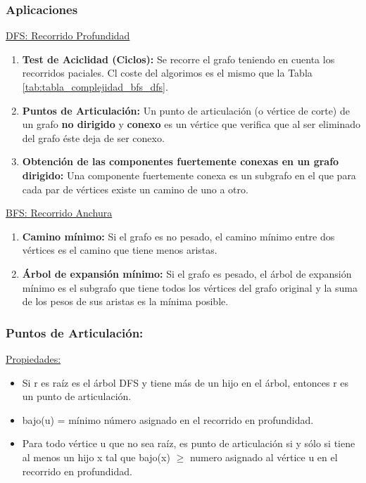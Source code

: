 \documentclass[../main.tex]{subfiles}
\begin{document}
        \subsubsection{Aplicaciones}
            \underline{DFS: Recorrido Profundidad}
            \begin{enumerate}
                \item \textbf{Test de Aciclidad (Ciclos):} Se recorre el grafo teniendo en cuenta los recorridos paciales. Cl coste del algorimos es el mismo que la Tabla \ref{tab:tabla_complejidad_bfs_dfs}.
                \item  \textbf{Puntos de Articulación:} Un punto de articulación (o vértice de corte) de un grafo \textbf{no dirigido} y \textbf{conexo} es un vértice que verifica que al ser eliminado del grafo éste deja de ser conexo.
                \item \textbf{Obtención de las componentes fuertemente conexas en un grafo dirigido:} Una componente fuertemente conexa es un subgrafo en el que para cada par de vértices existe un camino de uno a otro.
            \end{enumerate}

            \underline{BFS: Recorrido Anchura}
            \begin{enumerate}
                \item \textbf{Camino mínimo:} Si el grafo es no pesado, el camino mínimo entre dos vértices es el camino que tiene menos aristas.
                \item \textbf{Árbol de expansión mínimo:} Si el grafo es pesado, el árbol de expansión mínimo es el subgrafo que tiene todos los vértices del grafo original y la suma de los pesos de sus aristas es la mínima posible.
            \end{enumerate}

        \subsubsection{Puntos de Articulación:}
            \underline{Propiedades:}
            \begin{itemize}
                \item Si r es raíz es el árbol DFS y tiene más de un hijo en el árbol, entonces r es un punto de articulación.
                \item bajo(u) = mínimo número asignado en el recorrido en profundidad.
                \item Para todo vértice u que no sea raíz, es punto de articulación si y sólo si tiene al menos un hijo x tal que bajo(x) $\geq$ numero asignado al vértice u en el recorrido en profundidad.
            \end{itemize}
\end{document}
